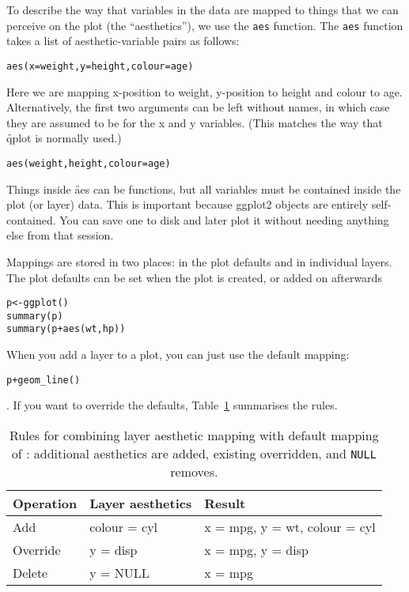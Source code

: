 To describe the way that variables in the data are mapped to things that we can perceive on the plot (the ``aesthetics''), we use the {\tt aes} function.  The {\tt aes} function takes a list of aesthetic-variable pairs as follows:

\begin{alltt}
aes(x = weight, y = height, colour = age)
\end{alltt}

Here we are mapping x-position to weight, y-position to height and colour to age.  Alternatively, the first two arguments can be left without names, in which case they are assumed to be for the x and y variables.  (This matches the way that \f{qplot} is normally used.)

\begin{alltt}
aes(weight, height, colour = age)
\end{alltt}

Things inside \f{aes} can be functions, but all variables must be contained inside the plot (or layer) data.  This is important because ggplot2 objects are entirely self-contained.  You can save one to disk and later plot it without needing anything else from that session.

Mappings are stored in two places: in the plot defaults and in individual layers.  The plot defaults can be set when the plot is created, or added on afterwards

\begin{alltt}
p <- ggplot()
summary(p)
summary(p + aes(wt, hp))
\end{alltt}

When you add a layer to a plot, you can just use the default mapping: 

\begin{alltt}
p + geom_line()
\end{alltt}

\noindent.  If you want to override the defaults, Table~\ref{tbl:aes-override} summarises the rules.

\begin{table}
  \begin{center}
  \begin{tabular}{lll}
    \toprule
    Operation & Layer aesthetics  & Result \\
    \midrule
    Add       & colour = cyl & x = mpg, y = wt, colour = cyl \\
    Override  & y = disp     & x = mpg, y = disp \\
    Delete    & y = NULL     & x = mpg \\
    \bottomrule
  \end{tabular}
  \end{center}
  \caption{Rules for combining layer aesthetic mapping with default mapping of :  additional aesthetics are added, existing overridden, and {\tt NULL} removes.}
  \label{tbl:aes-override}
\end{table}


